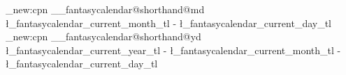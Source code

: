 %

\cs_new:cpn { __fantasycalendar@shorthand@md}
  {
    \l_fantasycalendar_current_month_tl - \l_fantasycalendar_current_day_tl
  }
\cs_new:cpn { __fantasycalendar@shorthand@yd}
  {
    \l_fantasycalendar_current_year_tl -
    \l_fantasycalendar_current_month_tl - \l_fantasycalendar_current_day_tl
  }



\ExplSyntaxOff
\makeatother

\endinput
